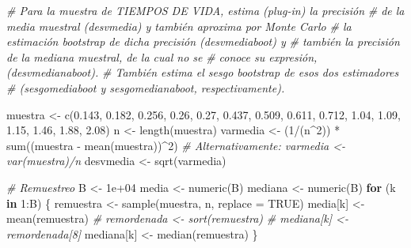 \documentclass[
]{book}
\newenvironment{Shaded}{\begin{snugshade}}{\end{snugshade}}
\newcommand{\AttributeTok}[1]{\textcolor[rgb]{0.77,0.63,0.00}{#1}}
\newcommand{\CommentTok}[1]{\textcolor[rgb]{0.56,0.35,0.01}{\textit{#1}}}
\newcommand{\ConstantTok}[1]{\textcolor[rgb]{0.00,0.00,0.00}{#1}}
\newcommand{\ControlFlowTok}[1]{\textcolor[rgb]{0.13,0.29,0.53}{\textbf{#1}}}
\newcommand{\DecValTok}[1]{\textcolor[rgb]{0.00,0.00,0.81}{#1}}
\newcommand{\FloatTok}[1]{\textcolor[rgb]{0.00,0.00,0.81}{#1}}
\newcommand{\FunctionTok}[1]{\textcolor[rgb]{0.00,0.00,0.00}{#1}}
\newcommand{\NormalTok}[1]{#1}
\newcommand{\OtherTok}[1]{\textcolor[rgb]{0.56,0.35,0.01}{#1}}
\newcommand{\SpecialCharTok}[1]{\textcolor[rgb]{0.00,0.00,0.00}{#1}}
\theoremstyle{break}
\theoremstyle{definition}
\theoremstyle{definition}
\theoremstyle{definition}
\theoremstyle{definition}
\theoremstyle{remark}
\begin{document}
\begin{Shaded}
\begin{Highlighting}[]
\CommentTok{\# Para la muestra de TIEMPOS DE VIDA, estima (plug{-}in) la precisión }
\CommentTok{\# de la media muestral (desvmedia) y también aproxima por Monte Carlo}
\CommentTok{\# la estimación bootstrap de dicha precisión (desvmediaboot) y}
\CommentTok{\# también la precisión de la mediana muestral, de la cual no se}
\CommentTok{\# conoce su expresión, (desvmedianaboot).}
\CommentTok{\# También estima el sesgo bootstrap de esos dos estimadores }
\CommentTok{\# (sesgomediaboot y sesgomedianaboot, respectivamente).}

\NormalTok{muestra }\OtherTok{\textless{}{-}} \FunctionTok{c}\NormalTok{(}\FloatTok{0.143}\NormalTok{, }\FloatTok{0.182}\NormalTok{, }\FloatTok{0.256}\NormalTok{, }\FloatTok{0.26}\NormalTok{, }\FloatTok{0.27}\NormalTok{, }\FloatTok{0.437}\NormalTok{, }\FloatTok{0.509}\NormalTok{,}
    \FloatTok{0.611}\NormalTok{, }\FloatTok{0.712}\NormalTok{, }\FloatTok{1.04}\NormalTok{, }\FloatTok{1.09}\NormalTok{, }\FloatTok{1.15}\NormalTok{, }\FloatTok{1.46}\NormalTok{, }\FloatTok{1.88}\NormalTok{, }\FloatTok{2.08}\NormalTok{)}
\NormalTok{n }\OtherTok{\textless{}{-}} \FunctionTok{length}\NormalTok{(muestra)}
\NormalTok{varmedia }\OtherTok{\textless{}{-}}\NormalTok{ (}\DecValTok{1}\SpecialCharTok{/}\NormalTok{(n}\SpecialCharTok{\^{}}\DecValTok{2}\NormalTok{)) }\SpecialCharTok{*} \FunctionTok{sum}\NormalTok{((muestra }\SpecialCharTok{{-}} \FunctionTok{mean}\NormalTok{(muestra))}\SpecialCharTok{\^{}}\DecValTok{2}\NormalTok{)}
\CommentTok{\# Alternativamente: varmedia \textless{}{-} var(muestra)/n}
\NormalTok{desvmedia }\OtherTok{\textless{}{-}} \FunctionTok{sqrt}\NormalTok{(varmedia)}

\CommentTok{\# Remuestreo}
\NormalTok{B }\OtherTok{\textless{}{-}} \FloatTok{1e+04}
\NormalTok{media }\OtherTok{\textless{}{-}} \FunctionTok{numeric}\NormalTok{(B)}
\NormalTok{mediana }\OtherTok{\textless{}{-}} \FunctionTok{numeric}\NormalTok{(B)}
\ControlFlowTok{for}\NormalTok{ (k }\ControlFlowTok{in} \DecValTok{1}\SpecialCharTok{:}\NormalTok{B) \{}
\NormalTok{    remuestra }\OtherTok{\textless{}{-}} \FunctionTok{sample}\NormalTok{(muestra, n, }\AttributeTok{replace =} \ConstantTok{TRUE}\NormalTok{)}
\NormalTok{    media[k] }\OtherTok{\textless{}{-}} \FunctionTok{mean}\NormalTok{(remuestra)}
    \CommentTok{\# remordenada \textless{}{-} sort(remuestra)}
    \CommentTok{\# mediana[k] \textless{}{-} remordenada[8]}
\NormalTok{    mediana[k] }\OtherTok{\textless{}{-}} \FunctionTok{median}\NormalTok{(remuestra)}
\NormalTok{\}}


\end{Highlighting}
\end{Shaded}
\end{document}
